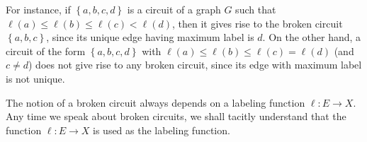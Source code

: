 \documentclass[numbers=enddot,12pt,final,onecolumn,notitlepage]{scrartcl}%
\theoremstyle{definition}
\begin{document}
For instance, if $\left\{  a,b,c,d\right\}  $ is a circuit of a graph $G$ such
that $\ell\left(  a\right)  \leq\ell\left(  b\right)  \leq\ell\left(
c\right)  <\ell\left(  d\right)  $, then it gives rise to the broken circuit
$\left\{  a,b,c\right\}  $, since its unique edge having maximum label is $d$.
On the other hand, a circuit of the form $\left\{  a,b,c,d\right\}  $ with
$\ell\left(  a\right)  \leq\ell\left(  b\right)  \leq\ell\left(  c\right)
=\ell\left(  d\right)  $ (and $c\neq d$) does not give rise to any broken
circuit, since its edge with maximum label is not unique.

The notion of a broken circuit always depends on a labeling function
$\ell:E\rightarrow X$. Any time we speak about broken circuits, we shall
tacitly understand that the function $\ell:E\rightarrow X$ is used as the
labeling function.
\end{document}
